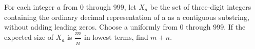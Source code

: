 For each integer $a$ from 0 through 999, let $X_a$ be the set of three-digit integers containing the ordinary decimal representation of a as a contiguous substring, without adding leading zeros. Choose a uniformly from 0 through 999. If the expected size of $X_a$ is $\dfrac{m}{n}$ in lowest terms, find $m+n$.
